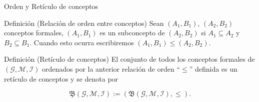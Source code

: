 \documentclass{beamer}
\newcommand{\M}{\mathcal{M}}
\newcommand{\I}{\mathcal{I}}
\newcommand{\G}{\mathcal{G}}
\begin{document}
  \begin{frame}{Orden y Retículo de conceptos}
      \begin{block}{Definición (Relación de orden entre conceptos)}
      \justifying
        Sean $(A_1,B_1)$, $(A_2,B_2)$ conceptos formales, $(A_1,B_1)$ es un subconcepto de $(A_2,B_2)$ si $A_1 \subseteq A_2$  y  $B_2 \subseteq B_1$. Cuando esto ocurra escribiremos $(A_1,B_1) \leq (A_2,B_2)$.
      \end{block}
      \pause
      \begin{block}{Definición (Retículo de conceptos)}
      \justifying
      El conjunto de todos los conceptos formales de $(\G,\M,\I)$ ordenados por la anterior relación de orden ``$\leq$'' definida es un retículo de conceptos y se denota por 

    $$\underline{\mathfrak{B}}(\G,\M,\I):= (\mathfrak{B}(\G,\M,\I),\leq).$$
    \end{block}
\end{frame}
\end{document}
